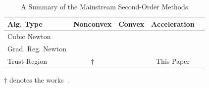 \documentclass{article}
\begin{document}
\begin{table}[t]
    \caption{A Summary of the Mainstream Second-Order Methods}
    \label{table.summary}
    \vskip 0.15in
    \begin{center}
        \begin{small}
            \begin{sc}
                \begin{tabular}{lcccr}
                    \toprule
                    Alg. Type         & Nonconvex                 & Convex                                                  & Acceleration                     \\
                    \midrule
                    Cubic Newton      & \citet{nesterov2006cubic} & \citet{nesterov2006cubic}                               & \citet{nesterov2008accelerating} \\
                    Grad. Reg. Newton & \citet{gratton2023yet}    & \citet{mishchenko_regularized_2023}                     & \citet{doikov2020contracting}    \\
                    Trust-Region      & $\dagger$                 & \citet{jiang2024nonconvexityuniversaltrustregionmethod} & This Paper                       \\
                    \bottomrule
                \end{tabular}
            \end{sc}
        \end{small}
    \end{center}
    \vskip -0.1in
    \begin{tablenotes}
        \small
        \item $\dagger$ denotes the works~\cite{curtis2017trust,curtis2021trust,luenberger_linear_2021,hamad2022consistently,hamad2024simplepracticaladaptivetrustregion,jiang2024nonconvexityuniversaltrustregionmethod}.
    \end{tablenotes}
\end{table}
\end{document}
